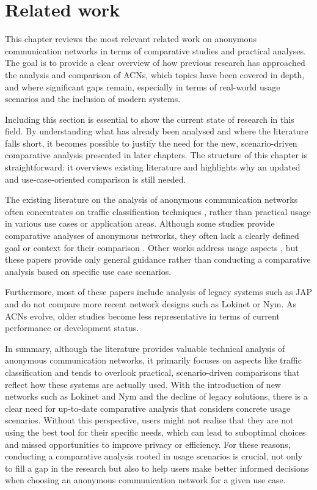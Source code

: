 \chapter{Related work}
\label{chap:Related}

This chapter reviews the most relevant related work on anonymous communication networks in terms of comparative studies and practical analyses. The goal is to provide a clear overview of how previous research has approached the analysis and comparison of ACNs, which topics have been covered in depth, and where significant gaps remain, especially in terms of real-world usage scenarios and the inclusion of modern systems.

Including this section is essential to show the current state of research in this field. By understanding what has already been analysed and where the literature falls short, it becomes possible to justify the need for the new, scenario-driven comparative analysis presented in later chapters. The structure of this chapter is straightforward: it overviews existing literature and highlights why an updated and use-case-oriented comparison is still needed.

The existing literature on the analysis of anonymous communication networks often concentrates on traffic classification techniques \cite{analysis-classification-jap, analysis-hierarchical-traffic-classification-jap, analysis-packet-momentum-identification-jap, analysis-phd-thesis-identification-jap}, rather than practical usage in various use cases or application areas. Although some studies provide comparative analyses of anonymous networks, they often lack a clearly defined goal or context for their comparison \cite{analysis-tor-vs-i2p}. Other works address usage aspects \cite{analysis-tools-usage-jap, analysis-acn-usage-jap-old}, but these papers provide only general guidance rather than conducting a comparative analysis based on specific use case scenarios.

Furthermore, most of these papers include analysis of legacy systems such as JAP and do not compare more recent network designs such as Lokinet or Nym. As ACNs evolve, older studies become less representative in terms of current performance or development status.

In summary, although the literature provides valuable technical analysis of anonymous communication networks, it primarily focuses on aspects like traffic classification and tends to overlook practical, scenario-driven comparisons that reflect how these systems are actually used. With the introduction of new networks such as Lokinet and Nym and the decline of legacy solutions, there is a clear need for up-to-date comparative analysis that considers concrete usage scenarios. Without this perspective, users might not realise that they are not using the best tool for their specific needs, which can lead to suboptimal choices and missed opportunities to improve privacy or efficiency. For these reasons, conducting a comparative analysis rooted in usage scenarios is crucial, not only to fill a gap in the research but also to help users make better informed decisions when choosing an anonymous communication network for a given use case.

